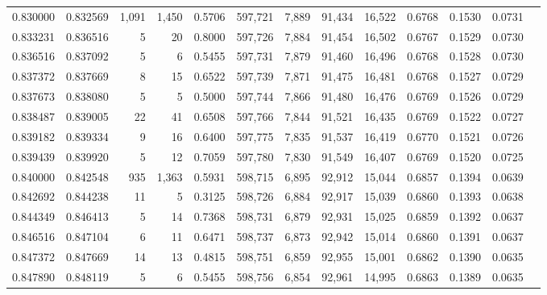 \begin{tabular}{rrrrrrrrrrrrr}
0.830000 & 0.832569 &  1,091 & 1,450 &                                     0.5706 & 597,721 &   7,889 &  91,434 &  16,522 & 0.6768 & 0.1530 & 0.0731 \\
0.833231 & 0.836516 &      5 &    20 &                                     0.8000 & 597,726 &   7,884 &  91,454 &  16,502 & 0.6767 & 0.1529 & 0.0730 \\
0.836516 & 0.837092 &      5 &     6 &                                     0.5455 & 597,731 &   7,879 &  91,460 &  16,496 & 0.6768 & 0.1528 & 0.0730 \\
0.837372 & 0.837669 &      8 &    15 &                                     0.6522 & 597,739 &   7,871 &  91,475 &  16,481 & 0.6768 & 0.1527 & 0.0729 \\
0.837673 & 0.838080 &      5 &     5 &                                     0.5000 & 597,744 &   7,866 &  91,480 &  16,476 & 0.6769 & 0.1526 & 0.0729 \\
0.838487 & 0.839005 &     22 &    41 &                                     0.6508 & 597,766 &   7,844 &  91,521 &  16,435 & 0.6769 & 0.1522 & 0.0727 \\
0.839182 & 0.839334 &      9 &    16 &                                     0.6400 & 597,775 &   7,835 &  91,537 &  16,419 & 0.6770 & 0.1521 & 0.0726 \\
0.839439 & 0.839920 &      5 &    12 &                                     0.7059 & 597,780 &   7,830 &  91,549 &  16,407 & 0.6769 & 0.1520 & 0.0725 \\
0.840000 & 0.842548 &    935 & 1,363 &                                     0.5931 & 598,715 &   6,895 &  92,912 &  15,044 & 0.6857 & 0.1394 & 0.0639 \\
0.842692 & 0.844238 &     11 &     5 &                                     0.3125 & 598,726 &   6,884 &  92,917 &  15,039 & 0.6860 & 0.1393 & 0.0638 \\
0.844349 & 0.846413 &      5 &    14 &                                     0.7368 & 598,731 &   6,879 &  92,931 &  15,025 & 0.6859 & 0.1392 & 0.0637 \\
0.846516 & 0.847104 &      6 &    11 &                                     0.6471 & 598,737 &   6,873 &  92,942 &  15,014 & 0.6860 & 0.1391 & 0.0637 \\
0.847372 & 0.847669 &     14 &    13 &                                     0.4815 & 598,751 &   6,859 &  92,955 &  15,001 & 0.6862 & 0.1390 & 0.0635 \\
0.847890 & 0.848119 &      5 &     6 &                                     0.5455 & 598,756 &   6,854 &  92,961 &  14,995 & 0.6863 & 0.1389 & 0.0635 \\

\end{tabular}
